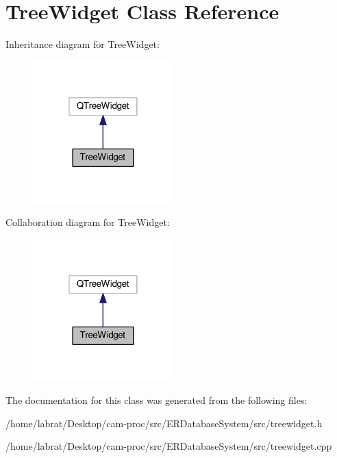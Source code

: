 \hypertarget{classTreeWidget}{}\section{Tree\+Widget Class Reference}
\label{classTreeWidget}


Inheritance diagram for Tree\+Widget\+:\nopagebreak
\begin{figure}[H]
\begin{center}
\leavevmode
\includegraphics[width=154pt]{classTreeWidget__inherit__graph}
\end{center}
\end{figure}


Collaboration diagram for Tree\+Widget\+:\nopagebreak
\begin{figure}[H]
\begin{center}
\leavevmode
\includegraphics[width=154pt]{classTreeWidget__coll__graph}
\end{center}
\end{figure}


The documentation for this class was generated from the following files\+:\begin{DoxyCompactItemize}
\item 
/home/labrat/\+Desktop/cam-\/proc/src/\+E\+R\+Database\+System/src/treewidget.\+h\item 
/home/labrat/\+Desktop/cam-\/proc/src/\+E\+R\+Database\+System/src/treewidget.\+cpp\end{DoxyCompactItemize}

